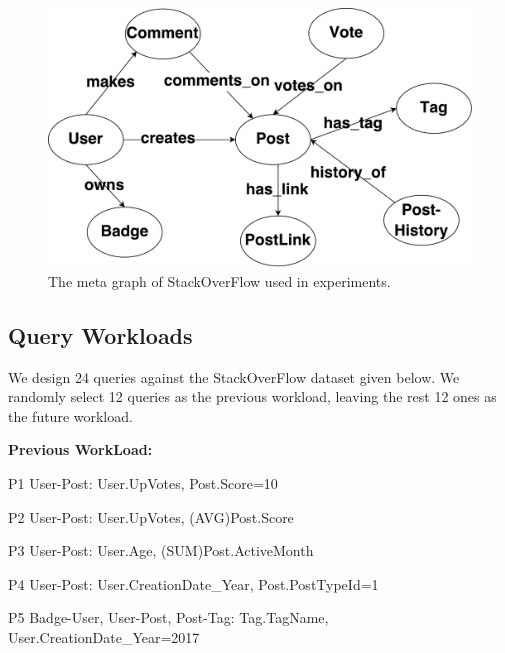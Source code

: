 \begin{figure}[H]
	\centering
	\includegraphics[scale=0.6]{pic/expmeta.pdf}
	\caption{The meta graph of StackOverFlow used in experiments.}
	\label{fig:metaexp}
\end{figure}



\subsection{Query Workloads}
We design 24  queries against the StackOverFlow dataset given below. We randomly select 12 queries as the previous workload, leaving the rest 12 ones as the future workload.  %


\textbf{Previous WorkLoad:}

P1 \hspace{3mm} User-Post: User.UpVotes, Post.Score=10

P2 \hspace{3mm} User-Post: User.UpVotes, (AVG)Post.Score

P3 \hspace{3mm} User-Post: User.Age, (SUM)Post.ActiveMonth

P4 \hspace{3mm} User-Post: User.CreationDate\_Year, Post.PostTypeId=1

P5 \hspace{3mm} Badge-User, User-Post, Post-Tag: Tag.TagName, User.CreationDate\_Year=2017

